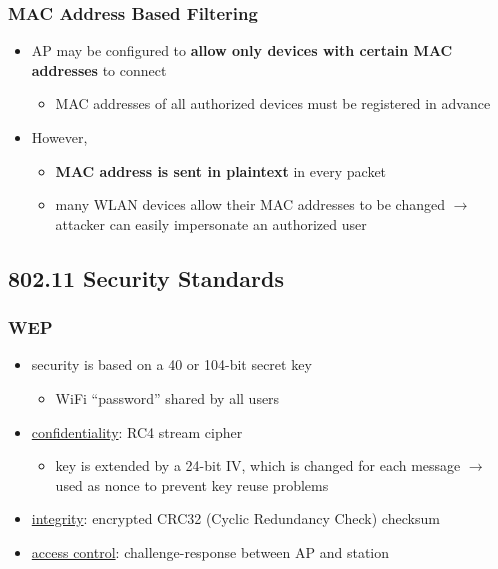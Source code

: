 \documentclass[final]{article}
\begin{document}
\subsubsection*{MAC Address Based Filtering}
\begin{itemize}[nosep]
    \item AP may be configured to \textbf{allow only devices with certain MAC addresses} to connect
          \begin{itemize}[nosep]
              \item MAC addresses of all authorized devices must be registered in advance
          \end{itemize}
    \item However,
          \begin{itemize}[nosep]
              \item \textbf{MAC address is sent in plaintext} in every packet
              \item many WLAN devices allow their MAC addresses to be changed $\rightarrow$ attacker can easily impersonate an authorized user
          \end{itemize}
\end{itemize}
\subsection{802.11 Security Standards}
\subsubsection*{WEP}
\begin{itemize}
    \item security is based on a 40 or 104-bit secret key
          \begin{itemize}[nosep]
              \item WiFi “password” shared by all users
          \end{itemize}
    \item \underline{confidentiality}: RC4 stream cipher
          \begin{itemize}[nosep]
              \item key is extended by a 24-bit IV, which is changed for each message $\rightarrow$ used as nonce to prevent key reuse problems
          \end{itemize}
    \item \underline{integrity}: encrypted CRC32 (Cyclic Redundancy Check) checksum
    \item \underline{access control}: challenge-response between AP and station
\end{itemize}
\end{document}
